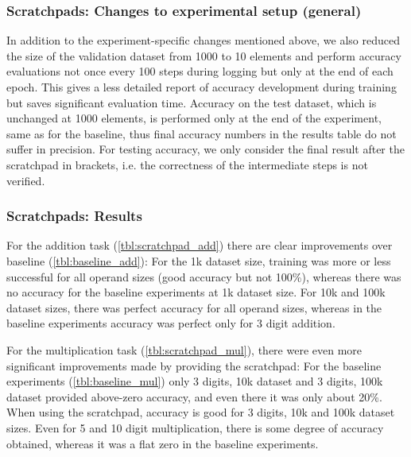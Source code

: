 \subsubsection{Scratchpads: Changes to experimental setup (general)}

In addition to the experiment-specific changes mentioned above, we also reduced the size of the validation dataset from 1000 to 10 elements and perform accuracy evaluations not once every 100 steps during logging but only at the end of each epoch. This gives a less detailed report of accuracy development during training but saves significant evaluation time. Accuracy on the test dataset, which is unchanged at 1000 elements, is performed only at the end of the experiment, same as for the baseline, thus final accuracy numbers in the results table do not suffer in precision.
For testing accuracy, we only consider the final result after the scratchpad in brackets, i.e. the correctness of the intermediate steps is not verified.

\subsubsection{Scratchpads: Results}


For the addition task  (\cref{tbl:scratchpad_add}) there are clear improvements over baseline (\cref{tbl:baseline_add}): For the 1k dataset size, training was more or less successful for all operand sizes (good accuracy but not 100\%), whereas there was no accuracy for the baseline experiments at 1k dataset size.
For 10k and 100k dataset sizes, there was perfect accuracy for all operand sizes, whereas in the baseline experiments accuracy was perfect only for 3 digit addition.


For the multiplication task (\cref{tbl:scratchpad_mul}), there were even more significant improvements made by providing the scratchpad: For the baseline experiments (\cref{tbl:baseline_mul}) only 3 digits, 10k dataset and 3 digits, 100k dataset provided above-zero accuracy, and even there it was only about 20\%. When using the scratchpad, accuracy is good for 
3 digits, 10k and 100k dataset sizes. Even for 5 and 10 digit multiplication, there is some degree of accuracy obtained, whereas it was a flat zero in the baseline experiments.

